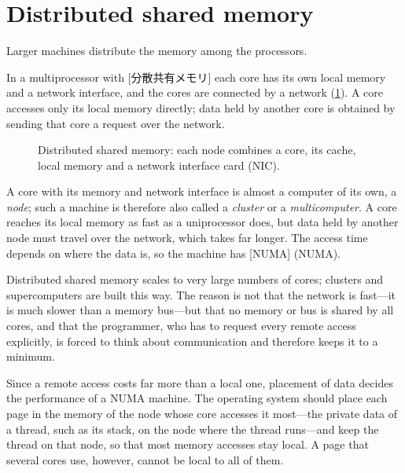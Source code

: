 \documentclass[../main.tex]{subfiles}
\begin{document}
\section{Distributed shared memory}
\label{sec:l18-distributed}

Larger machines distribute the memory among the
processors.

\begin{definition}
  In a multiprocessor with [分散共有メモリ]
  each core has its own local memory and a network interface, and the cores
  are connected by a network (\cref{fig:l18-distributed}).  A core accesses
  only its local memory directly; data held by another core is obtained by
  sending that core a request over the network.
\end{definition}

\begin{figure}[htbp]
  \centering
  
  \caption{Distributed shared memory: each node combines a core, its cache, local
    memory and a network interface card (NIC).}
  \label{fig:l18-distributed}
\end{figure}

A core with its memory and network interface is almost a computer of its
own, a \emph{node}; such a machine is therefore also called a
\emph{cluster} or a \emph{multicomputer}.  A core reaches its local memory
as fast as a uniprocessor does, but data held by another node must travel
over the network, which takes far longer.  The access time depends on where
the data is, so the machine has
[NUMA]%
 (NUMA).

Distributed shared memory scales to very large numbers of cores; clusters and
supercomputers are built this way.  The reason is not that the network is
fast---it is much slower than a memory bus---but that no memory or bus is
shared by all cores, and that the programmer, who has to request every
remote access explicitly, is forced to think about communication and
therefore keeps it to a minimum.

Since a remote access costs far more than a local one, placement of data
decides the performance of a NUMA machine.  The operating system should
place each page in the memory of the node whose core accesses it most---the
private data of a thread, such as its stack, on the node where the thread
runs---and keep the thread on that node, so that most memory accesses stay
local.  A page that several cores use, however, cannot be local to all of
them.
\end{document}

